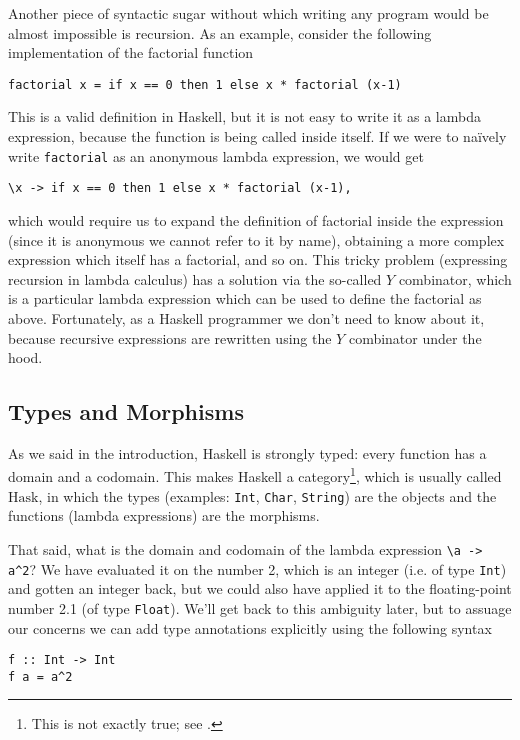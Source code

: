 \documentclass[11	pt]{article}
\theoremstyle{nonumberplain}
\newcommand{\Hask}{\mathrm{Hask}}
\begin{document}
Another piece of syntactic sugar without which writing any program would be almost impossible is recursion. As an example, consider the following implementation of the factorial function
\begin{lstlisting}
factorial x = if x == 0 then 1 else x * factorial (x-1)
\end{lstlisting}

This is a valid definition in Haskell, but it is not easy to write it as a lambda expression, because the function is being called inside itself. If we were to naïvely write \lstinline|factorial| as an anonymous lambda expression, we would get
\begin{lstlisting}
\x -> if x == 0 then 1 else x * factorial (x-1),
\end{lstlisting}
which would require us to expand the definition of factorial inside the expression (since it is anonymous we cannot refer to it by name), obtaining a more complex expression which itself has a factorial, and so on. This tricky problem (expressing recursion in lambda calculus) has a solution via the so-called $Y$ combinator, which is a particular lambda expression which can be used to define the factorial as above. Fortunately, as a Haskell programmer we don't need to know about it, because recursive expressions are rewritten using the $Y$ combinator under the hood.

\subsection{Types and Morphisms}

As we said in the introduction, Haskell is strongly typed: every function has a domain and a codomain. This makes Haskell a category\footnote{This is not exactly true; see \cite{haskisnotcat}.}, which is usually called $\Hask$, in which the types (examples: \lstinline|Int|, \lstinline|Char|, \lstinline|String|) are the objects and the functions (lambda expressions) are the morphisms.

That said, what is the domain and codomain of the lambda expression \lstinline|\a -> a^2|? We have evaluated it on the number 2, which is an integer (i.e. of type \lstinline|Int|) and gotten an integer back, but we could also have applied it to the floating-point number 2.1 (of type \lstinline|Float|). We'll get back to this ambiguity later, but to assuage our concerns we can add type annotations explicitly using the following syntax
\begin{lstlisting}
f :: Int -> Int
f a = a^2
\end{lstlisting}
\end{document}

